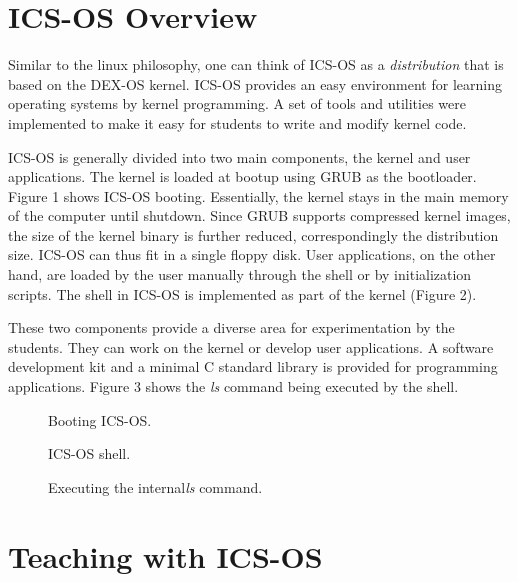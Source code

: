 \documentclass{acm_proc_article-sp}
\begin{document}
\section{ICS-OS Overview}
Similar to the linux philosophy, one can think of ICS-OS as a 
\textit{distribution} that is based on the DEX-OS kernel. ICS-OS provides 
an easy environment for learning operating systems by kernel programming. 
A set of tools and utilities were implemented to make it easy for students
to write and modify kernel code. 

ICS-OS is generally divided into two main components, the kernel and user 
applications. The kernel is loaded at bootup using GRUB as the bootloader.
Figure 1 shows ICS-OS booting. Essentially, the kernel stays in the main memory
of the computer until shutdown. Since GRUB supports compressed kernel images, 
the size of the kernel binary is further reduced, correspondingly the 
distribution size. ICS-OS can thus fit in a single floppy disk. User 
applications, on the other hand, are loaded by the user manually through the
shell or by initialization scripts. The shell in ICS-OS is implemented as part 
of the kernel (Figure 2).

These two components provide a diverse area for experimentation by the students.
They can work on the kernel or develop user applications. A software 
development kit and a minimal C standard library is provided for programming 
applications. Figure 3 shows the \textit{ls} command being executed by the 
shell.


\begin{figure}
\centering
{}
\caption{Booting ICS-OS.}
\end{figure}

\begin{figure}
\centering
{}
\caption{ICS-OS shell.}
\end{figure}

\begin{figure}
\centering
{}
\caption{Executing the internal\textit{ls} command.}
\end{figure}


\section{Teaching with ICS-OS}
\end{document}
